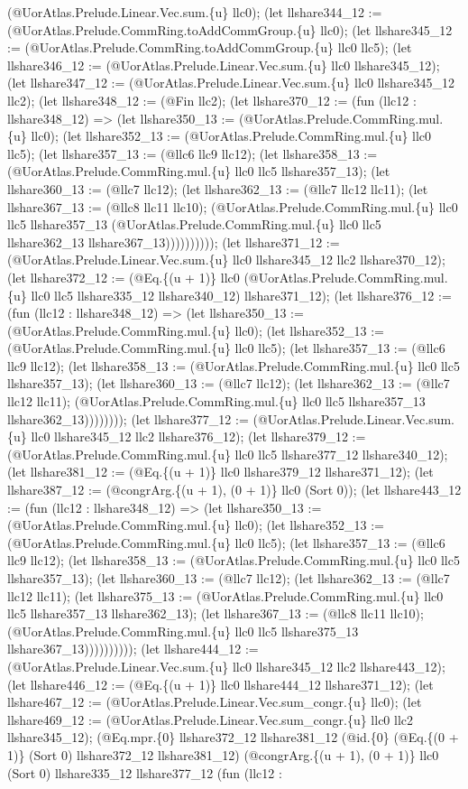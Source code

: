 \documentclass[11pt]{article}
\begin{document}
(@UorAtlas.Prelude.Linear.Vec.sum.\{u\} llc0); (let llshare344\_12 := (@UorAtlas.Prelude.CommRing.toAddCommGroup.\{u\} llc0); (let llshare345\_12 := (@UorAtlas.Prelude.CommRing.toAddCommGroup.\{u\} llc0 llc5); (let llshare346\_12 := (@UorAtlas.Prelude.Linear.Vec.sum.\{u\} llc0 llshare345\_12); (let llshare347\_12 := (@UorAtlas.Prelude.Linear.Vec.sum.\{u\} llc0 llshare345\_12 llc2); (let llshare348\_12 := (@Fin llc2); (let llshare370\_12 := (fun (llc12 : llshare348\_12) => (let llshare350\_13 := (@UorAtlas.Prelude.CommRing.mul.\{u\} llc0); (let llshare352\_13 := (@UorAtlas.Prelude.CommRing.mul.\{u\} llc0 llc5); (let llshare357\_13 := (@llc6 llc9 llc12); (let llshare358\_13 := (@UorAtlas.Prelude.CommRing.mul.\{u\} llc0 llc5 llshare357\_13); (let llshare360\_13 := (@llc7 llc12); (let llshare362\_13 := (@llc7 llc12 llc11); (let llshare367\_13 := (@llc8 llc11 llc10); (@UorAtlas.Prelude.CommRing.mul.\{u\} llc0 llc5 llshare357\_13 (@UorAtlas.Prelude.CommRing.mul.\{u\} llc0 llc5 llshare362\_13 llshare367\_13)))))))))); (let llshare371\_12 := (@UorAtlas.Prelude.Linear.Vec.sum.\{u\} llc0 llshare345\_12 llc2 llshare370\_12); (let llshare372\_12 := (@Eq.\{(u + 1)\} llc0 (@UorAtlas.Prelude.CommRing.mul.\{u\} llc0 llc5 llshare335\_12 llshare340\_12) llshare371\_12); (let llshare376\_12 := (fun (llc12 : llshare348\_12) => (let llshare350\_13 := (@UorAtlas.Prelude.CommRing.mul.\{u\} llc0); (let llshare352\_13 := (@UorAtlas.Prelude.CommRing.mul.\{u\} llc0 llc5); (let llshare357\_13 := (@llc6 llc9 llc12); (let llshare358\_13 := (@UorAtlas.Prelude.CommRing.mul.\{u\} llc0 llc5 llshare357\_13); (let llshare360\_13 := (@llc7 llc12); (let llshare362\_13 := (@llc7 llc12 llc11); (@UorAtlas.Prelude.CommRing.mul.\{u\} llc0 llc5 llshare357\_13 llshare362\_13)))))))); (let llshare377\_12 := (@UorAtlas.Prelude.Linear.Vec.sum.\{u\} llc0 llshare345\_12 llc2 llshare376\_12); (let llshare379\_12 := (@UorAtlas.Prelude.CommRing.mul.\{u\} llc0 llc5 llshare377\_12 llshare340\_12); (let llshare381\_12 := (@Eq.\{(u + 1)\} llc0 llshare379\_12 llshare371\_12); (let llshare387\_12 := (@congrArg.\{(u + 1), (0 + 1)\} llc0 (Sort 0)); (let llshare443\_12 := (fun (llc12 : llshare348\_12) => (let llshare350\_13 := (@UorAtlas.Prelude.CommRing.mul.\{u\} llc0); (let llshare352\_13 := (@UorAtlas.Prelude.CommRing.mul.\{u\} llc0 llc5); (let llshare357\_13 := (@llc6 llc9 llc12); (let llshare358\_13 := (@UorAtlas.Prelude.CommRing.mul.\{u\} llc0 llc5 llshare357\_13); (let llshare360\_13 := (@llc7 llc12); (let llshare362\_13 := (@llc7 llc12 llc11); (let llshare375\_13 := (@UorAtlas.Prelude.CommRing.mul.\{u\} llc0 llc5 llshare357\_13 llshare362\_13); (let llshare367\_13 := (@llc8 llc11 llc10); (@UorAtlas.Prelude.CommRing.mul.\{u\} llc0 llc5 llshare375\_13 llshare367\_13)))))))))); (let llshare444\_12 := (@UorAtlas.Prelude.Linear.Vec.sum.\{u\} llc0 llshare345\_12 llc2 llshare443\_12); (let llshare446\_12 := (@Eq.\{(u + 1)\} llc0 llshare444\_12 llshare371\_12); (let llshare467\_12 := (@UorAtlas.Prelude.Linear.Vec.sum\_congr.\{u\} llc0); (let llshare469\_12 := (@UorAtlas.Prelude.Linear.Vec.sum\_congr.\{u\} llc0 llc2 llshare345\_12); (@Eq.mpr.\{0\} llshare372\_12 llshare381\_12 (@id.\{0\} (@Eq.\{(0 + 1)\} (Sort 0) llshare372\_12 llshare381\_12) (@congrArg.\{(u + 1), (0 + 1)\} llc0 (Sort 0) llshare335\_12 llshare377\_12 (fun (llc12 : 
\end{document}
